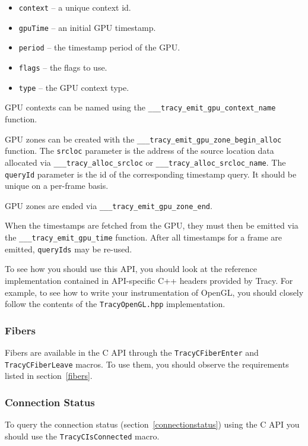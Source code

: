 \documentclass[hidelinks,titlepage,a4paper]{article}
\begin{document}
\begin{itemize}
\item \texttt{context} -- a unique context id.
\item \texttt{gpuTime} -- an initial GPU timestamp.
\item \texttt{period} -- the timestamp period of the GPU.
\item \texttt{flags} -- the flags to use.
\item \texttt{type} -- the GPU context type.
\end{itemize}

GPU contexts can be named using the \texttt{\_\_\_tracy\_emit\_gpu\_context\_name} function.

GPU zones can be created with the \texttt{\_\_\_tracy\_emit\_gpu\_zone\_begin\_alloc} function. The \texttt{srcloc} parameter is the address of the source location data allocated via \texttt{\_\_\_tracy\_alloc\_srcloc} or \texttt{\_\_\_tracy\_alloc\_srcloc\_name}. The \texttt{queryId} parameter is the id of the corresponding timestamp query. It should be unique on a per-frame basis.

GPU zones are ended via \texttt{\_\_\_tracy\_emit\_gpu\_zone\_end}.

When the timestamps are fetched from the GPU, they must then be emitted via the \texttt{\_\_\_tracy\_emit\_gpu\_time} function. After all timestamps for a frame are emitted, \texttt{queryIds} may be re-used.

To see how you should use this API, you should look at the reference implementation contained in API-specific C++ headers provided by Tracy. For example, to see how to write your instrumentation of OpenGL, you should closely follow the contents of the \texttt{TracyOpenGL.hpp} implementation.

\subsubsection{Fibers}

Fibers are available in the C API through the \texttt{TracyCFiberEnter} and \texttt{TracyCFiberLeave} macros. To use them, you should observe the requirements listed in section~\ref{fibers}.

\subsubsection{Connection Status}

To query the connection status (section~\ref{connectionstatus}) using the C API you should use the \texttt{TracyCIsConnected} macro.
\end{document}
